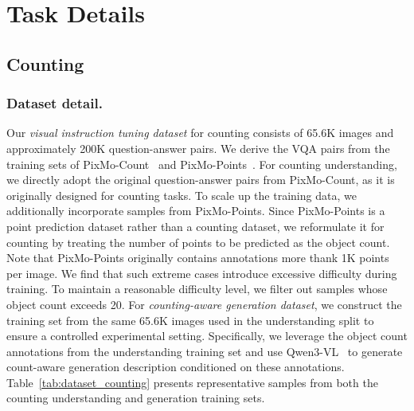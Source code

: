 \clearpage
\section{Task Details}
\label{sec:appendix_dataset_construction}
\subsection{Counting}
\subsubsection{Dataset detail.} Our \textit{visual instruction tuning dataset} for counting consists of 65.6K images and approximately 200K question-answer pairs. We derive the VQA pairs from the training sets of PixMo-Count~\cite{deitke2025molmo} and PixMo-Points~\cite{deitke2025molmo}.
For counting understanding, we directly adopt the original question-answer pairs from PixMo-Count, as it is originally designed for counting tasks. To scale up the training data, we additionally incorporate samples from PixMo-Points. Since PixMo-Points is a point prediction dataset rather than a counting dataset, we reformulate it for counting by treating the number of points to be predicted as the object count. Note that PixMo-Points originally contains annotations more thank 1K points per image. We find that such extreme cases introduce excessive difficulty during training. To maintain a reasonable difficulty level, we filter out samples whose object count exceeds 20. For \textit{counting-aware generation dataset}, we construct the training set from the same 65.6K images used in the understanding split to ensure a controlled experimental setting. Specifically, we leverage the object count annotations from the understanding training set and use Qwen3-VL~\cite{bai2025qwen3} to generate count-aware generation description conditioned on these annotations.
Table~\ref{tab:dataset_counting} presents representative samples from both the counting understanding and generation training sets.




